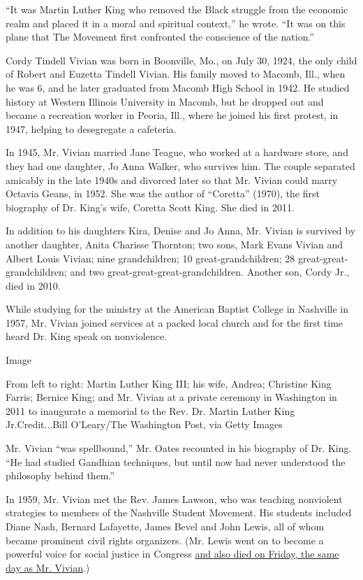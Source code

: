 ``It was Martin Luther King who removed the Black struggle from the
economic realm and placed it in a moral and spiritual context,'' he
wrote. ``It was on this plane that The Movement first confronted the
conscience of the nation.''

Cordy Tindell Vivian was born in Boonville, Mo., on July 30, 1924, the
only child of Robert and Euzetta Tindell Vivian. His family moved to
Macomb, Ill., when he was 6, and he later graduated from Macomb High
School in 1942. He studied history at Western Illinois University in
Macomb, but he dropped out and became a recreation worker in Peoria,
Ill., where he joined his first protest, in 1947, helping to desegregate
a cafeteria.

In 1945, Mr. Vivian married Jane Teague, who worked at a hardware store,
and they had one daughter, Jo Anna Walker, who survives him. The couple
separated amicably in the late 1940s and divorced later so that Mr.
Vivian could marry Octavia Geans, in 1952. She was the author of
``Coretta'' (1970), the first biography of Dr. King's wife, Coretta
Scott King. She died in 2011.

In addition to his daughters Kira, Denise and Jo Anna, Mr. Vivian is
survived by another daughter, Anita Charisse Thornton; two sons, Mark
Evans Vivian and Albert Louis Vivian; nine grandchildren; 10
great-grandchildren; 28 great-great-grandchildren; and two
great-great-great-grandchildren. Another son, Cordy Jr., died in 2010.

While studying for the ministry at the American Baptist College in
Nashville in 1957, Mr. Vivian joined services at a packed local church
and for the first time heard Dr. King speak on nonviolence.

Image

From left to right: Martin Luther King III; his wife, Andrea; Christine
King Farris; Bernice King; and Mr. Vivian at a private ceremony in
Washington in 2011 to inaugurate a memorial to the Rev. Dr. Martin
Luther King Jr.Credit...Bill O'Leary/The Washington Post, via Getty
Images

Mr. Vivian ``was spellbound,'' Mr. Oates recounted in his biography of
Dr. King. ``He had studied Gandhian techniques, but until now had never
understood the philosophy behind them.''

In 1959, Mr. Vivian met the Rev. James Lawson, who was teaching
nonviolent strategies to members of the Nashville Student Movement. His
students included Diane Nash, Bernard Lafayette, James Bevel and John
Lewis, all of whom became prominent civil rights organizers. (Mr. Lewis
went on to become a powerful voice for social justice in Congress
\href{https://www.nytimes3xbfgragh.onion/2020/07/17/us/john-lewis-dead.html}{and
also died on Friday, the same day as Mr. Vivian}.)

